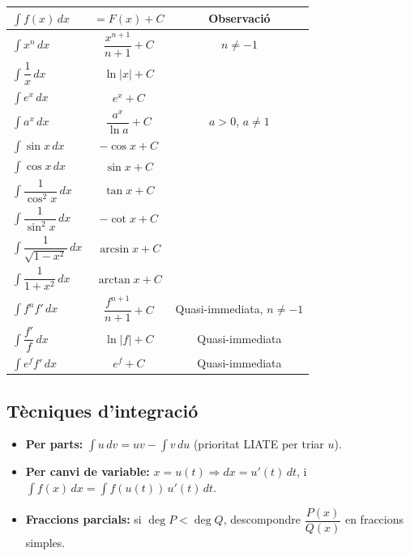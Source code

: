 \begin{table}[H]
\centering
\renewcommand{\arraystretch}{1.25}
\begin{tabular}{lcc}
\toprule
$\displaystyle\int f(x)\,dx$ & $= F(x) + C$ & Observació \\
\midrule
$\displaystyle\int x^n\,dx$ & $\dfrac{x^{n+1}}{n+1} + C$ & $n \neq -1$ \\
$\displaystyle\int \dfrac{1}{x}\,dx$ & $\ln\lvert x\rvert + C$ &  \\
$\displaystyle\int e^x\,dx$ & $e^x + C$ &  \\
$\displaystyle\int a^x\,dx$ & $\dfrac{a^x}{\ln a} + C$ & $a > 0$, $a \neq 1$ \\
$\displaystyle\int \sin x\,dx$ & $-\cos x + C$ &  \\
$\displaystyle\int \cos x\,dx$ & $\sin x + C$ &  \\
$\displaystyle\int \dfrac{1}{\cos^2 x}\,dx$ & $\tan x + C$ &  \\
$\displaystyle\int \dfrac{1}{\sin^2 x}\,dx$ & $-\cot x + C$ &  \\
$\displaystyle\int \dfrac{1}{\sqrt{1-x^2}}\,dx$ & $\arcsin x + C$ &  \\
$\displaystyle\int \dfrac{1}{1+x^2}\,dx$ & $\arctan x + C$ &  \\
$\displaystyle\int f^n f'\,dx$ & $\dfrac{f^{n+1}}{n+1} + C$ & Quasi-immediata, $n \neq -1$ \\
$\displaystyle\int \dfrac{f'}{f}\,dx$ & $\ln\lvert f\rvert + C$ & Quasi-immediata \\
$\displaystyle\int e^{f}f'\,dx$ & $e^{f} + C$ & Quasi-immediata \\
\bottomrule
\end{tabular}
\end{table}

\subsection*{Tècniques d'integració}

\begin{itemize}
\item \textbf{Per parts:} $\displaystyle\int u\,dv = uv - \int v\,du$ (prioritat LIATE per triar $u$).
\item \textbf{Per canvi de variable:} $x = u(t) \Rightarrow dx = u'(t)\,dt$, i $\displaystyle\int f(x)\,dx = \int f(u(t))\,u'(t)\,dt$.
\item \textbf{Fraccions parcials:} si $\deg P < \deg Q$, descompondre $\dfrac{P(x)}{Q(x)}$ en fraccions simples.
\end{itemize}
